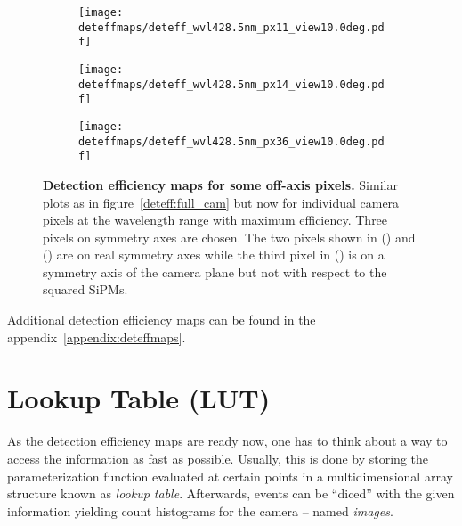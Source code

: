 \begin{figure}[H]
	\centering
	\begin{subfigure}[t]{\textwidth}
		\texttt{[image: deteffmaps/deteff\_wvl428.5nm\_px11\_view10.0deg.pdf]}
		\label{deteff:offaxis_px:1}
	\end{subfigure}
\end{figure}
\begin{figure}[H]
	\ContinuedFloat
	\centering
	\begin{subfigure}[t]{\textwidth}
		\texttt{[image: deteffmaps/deteff\_wvl428.5nm\_px14\_view10.0deg.pdf]}
		\label{deteff:offaxis_px:2}
	\end{subfigure}
	\vfill
	\begin{subfigure}[t]{\textwidth}
		\texttt{[image: deteffmaps/deteff\_wvl428.5nm\_px36\_view10.0deg.pdf]}
		\label{deteff:offaxis_px:3}
	\end{subfigure}
	\caption[Detection efficiency maps for some off-axis pixels]{\textbf{Detection efficiency maps for some off-axis pixels.} Similar plots as in figure~\ref{deteff:full_cam} but now for individual camera pixels at the wavelength range with maximum efficiency. Three pixels on symmetry axes are chosen. The two pixels shown in () and () are on real symmetry axes while the third pixel in () is on a symmetry axis of the camera plane but not with respect to the squared SiPMs.}
	\label{deteff:offaxis_px}		
\end{figure}

Additional detection efficiency maps can be found in the appendix~\ref{appendix:deteffmaps}.

\section{Lookup Table (LUT)}

As the detection efficiency maps are ready now, one has to think about a way to access the information as fast as possible. Usually, this is done by storing the parameterization function evaluated at certain points in a multidimensional array structure known as \textit{lookup table}. Afterwards, events can be \enquote{diced} with the given information yielding count histograms for the camera -- named \textit{images}.

